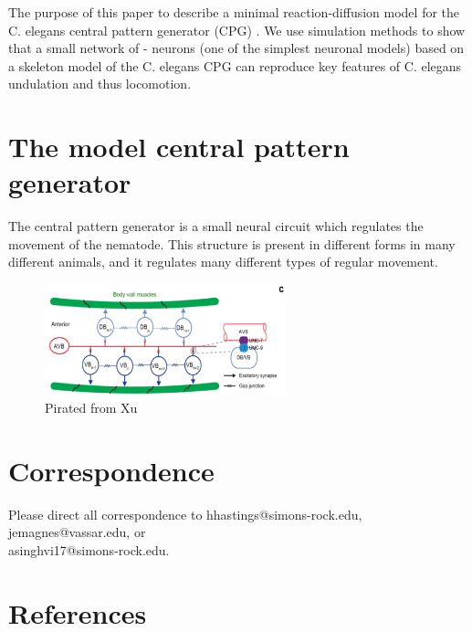 \documentclass[
    11pt,
    preprint,
    author-numerical,
    aps,
    prl, %
    natbib,
    superscriptaddress,
]{revtex4-2}
\begin{document}
The purpose of this paper to describe a minimal reaction-diffusion model for the C. elegans central pattern generator (CPG) \citep{xu2018, wen2012}. We use simulation methods to show that a small network of \cite{fitzhugh1955}-\cite{nagumo1962} neurons (one of the simplest neuronal models) based on a skeleton model of the C. elegans CPG can reproduce key features of C. elegans undulation \citep{magnes2012} and thus locomotion.

\section{The model central pattern generator}

The central pattern generator is a small neural circuit which regulates the movement of the nematode.  This structure is present in different forms in many different animals, and it regulates many different types of regular movement.

\begin{figure}[h!]
    \label{fig: xu_cpg}
    \centering
    \includegraphics[width=7cm]{figures/xu_cpg/xu_cpg.png}
    \caption{Pirated from Xu}
\end{figure}




\section{Correspondence}\label{correspondence}
\makeatletter
Please direct all correspondence to hhastings@simons-rock.edu,
jemagnes@vassar.edu, or\\asinghvi17@simons-rock.edu.
\makeatother

\section{References}

\nocite{*}

\end{document}
